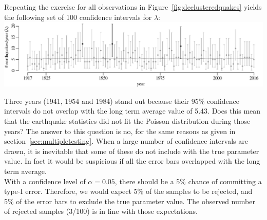 Repeating the exercise for all observations in
Figure~\ref{fig:declusteredquakes} yields the following set of 100
confidence intervals for $\lambda$:\\

\noindent\includegraphics[width=\textwidth]{../figures/poiserrbars.pdf}
\begingroup {}  \endgroup

Three years (1941, 1954 and 1984) stand out because their 95\%
confidence intervals do not overlap with the long term average value
of 5.43. Does this mean that the earthquake statistics did not fit the
Poisson distribution during those years? The answer to this question
is no, for the same reasons as given in
section~\ref{sec:multipletesting}. When a large number of confidence
intervals are drawn, it is inevitable that some of these do not
include with the true parameter value. In fact it would be suspicious
if all the error bars overlapped with the long term average.\\

With a confidence level of $\alpha=0.05$, there should be a 5\%
chance of committing a type-I error.  Therefore, we would expect 5\%
of the samples to be rejected, and 5\% of the error bars to exclude
the true parameter value. The observed number of rejected samples
(3/100) is in line with those expectations.
